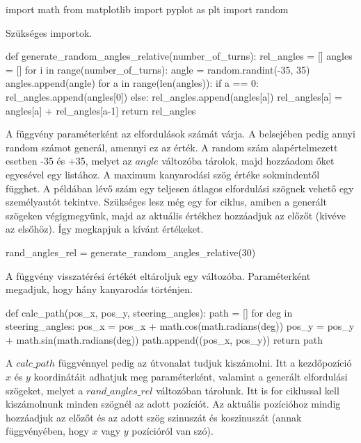 \begin{python}
import math
from matplotlib import pyplot as plt
import random
\end{python}
Szükséges importok.

\begin{python}
def generate_random_angles_relative(number_of_turns):
        rel_angles = []
        angles = []
        for i in range(number_of_turns):
            angle = random.randint(-35, 35)
            angles.append(angle)
        for a in range(len(angles)):
            if a == 0:
                rel_angles.append(angles[0])
            else:
                rel_angles.append(angles[a])
                rel_angles[a] = angles[a] + rel_angles[a-1]
        return rel_angles
\end{python}
A függvény paraméterként az elfordulások számát várja. A belsejében pedig annyi random számot generál, amennyi ez az érték. A random szám alapértelmezett esetben -35 és +35, melyet az $angle$ változóba tárolok, majd hozzáadom őket egyesével egy listához. A maximum kanyarodási szög értéke sokmindentől függhet. A példában lévő szám egy teljesen átlagos elfordulási szögnek vehető egy személyautót tekintve. Szükséges lesz még egy for ciklus, amiben a generált szögeken végigmegyünk, majd az aktuális értékhez hozzáadjuk az előzőt (kivéve az elsőhöz). Így megkapjuk a kívánt értékeket. 

\begin{python}
rand_angles_rel = generate_random_angles_relative(30)
\end{python}
A függvény visszatérési értékét eltároljuk egy változóba. Paraméterként megadjuk, hogy hány kanyarodás történjen.

\begin{python}
def calc_path(pos_x, pos_y, steering_angles):
        path = []
        for deg in steering_angles:
            pos_x = pos_x + math.cos(math.radians(deg))
            pos_y = pos_y + math.sin(math.radians(deg))
            path.append((pos_x, pos_y))
        return path
\end{python}
A $calc\_path$ függvénnyel pedig az útvonalat tudjuk kiszámolni. Itt a kezdőpozíció $ x $ és $ y $ koordinátáit adhatjuk meg paraméterként, valamint a generált elfordulási szögeket, melyet a $rand\_angles\_rel$ változóban tárolunk. Itt is for ciklussal kell kiszámolnunk minden szögnél az adott pozíciót. Az aktuális pozícióhoz mindig hozzáadjuk az előzőt és az adott szög szinuszát és koszinuszát (annak függvényében, hogy $ x $ vagy $ y $ pozícióról van szó). 

